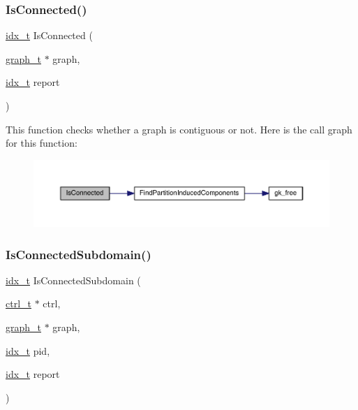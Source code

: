 \subsubsection{\texorpdfstring{Is\+Connected()}{IsConnected()}}
{\footnotesize\ttfamily \hyperlink{a00876_aaa5262be3e700770163401acb0150f52}{idx\+\_\+t} Is\+Connected (\begin{DoxyParamCaption}\item[{\hyperlink{a00734}{graph\+\_\+t} $\ast$}]{graph,  }\item[{\hyperlink{a00876_aaa5262be3e700770163401acb0150f52}{idx\+\_\+t}}]{report }\end{DoxyParamCaption})}

This function checks whether a graph is contiguous or not. Here is the call graph for this function\+:\nopagebreak
\begin{figure}[H]
\begin{center}
\leavevmode
\includegraphics[width=350pt]{a00945_a06638e74c8e49f9fb9881b960f8c4f05_cgraph}
\end{center}
\end{figure}
\mbox{\label{a00945_a123c09e42bbe2336d7abe9b0ddbe9b98}} 
\subsubsection{\texorpdfstring{Is\+Connected\+Subdomain()}{IsConnectedSubdomain()}}
{\footnotesize\ttfamily \hyperlink{a00876_aaa5262be3e700770163401acb0150f52}{idx\+\_\+t} Is\+Connected\+Subdomain (\begin{DoxyParamCaption}\item[{\hyperlink{a00742}{ctrl\+\_\+t} $\ast$}]{ctrl,  }\item[{\hyperlink{a00734}{graph\+\_\+t} $\ast$}]{graph,  }\item[{\hyperlink{a00876_aaa5262be3e700770163401acb0150f52}{idx\+\_\+t}}]{pid,  }\item[{\hyperlink{a00876_aaa5262be3e700770163401acb0150f52}{idx\+\_\+t}}]{report }\end{DoxyParamCaption})}

